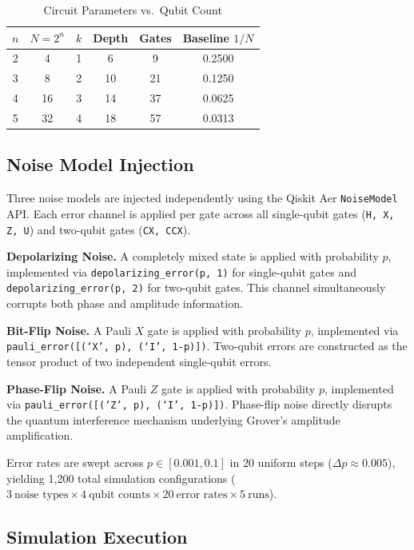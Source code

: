 \documentclass[conference]{IEEEtran}
\begin{document}
\begin{table}[htbp]
  \centering
  \caption{Circuit Parameters vs.\ Qubit Count}
  \label{tab:circuit}
  \begin{tabular}{ccccc c}
    \toprule
    $n$ & $N=2^n$ & $k$ & Depth & Gates & Baseline $1/N$ \\
    \midrule
    2 & 4  & 1 & 6  & 9  & 0.2500 \\
    3 & 8  & 2 & 10 & 21 & 0.1250 \\
    4 & 16 & 3 & 14 & 37 & 0.0625 \\
    5 & 32 & 4 & 18 & 57 & 0.0313 \\
    \bottomrule
  \end{tabular}
\end{table}

\subsection{Noise Model Injection}

Three noise models are injected independently using the Qiskit Aer \texttt{NoiseModel}
API. Each error channel is applied per gate across all single-qubit gates
(\texttt{H, X, Z, U}) and two-qubit gates (\texttt{CX, CCX}).

\textbf{Depolarizing Noise.} A completely mixed state is applied with probability
$p$, implemented via \texttt{depolarizing\_error(p, 1)} for single-qubit gates and
\texttt{depolarizing\_error(p, 2)} for two-qubit gates. This channel simultaneously
corrupts both phase and amplitude information.

\textbf{Bit-Flip Noise.} A Pauli $X$ gate is applied with probability $p$,
implemented via \texttt{pauli\_error([(`X', p), (`I', 1-p)])}. Two-qubit errors are
constructed as the tensor product of two independent single-qubit errors.

\textbf{Phase-Flip Noise.} A Pauli $Z$ gate is applied with probability $p$,
implemented via \texttt{pauli\_error([(`Z', p), (`I', 1-p)])}. Phase-flip noise
directly disrupts the quantum interference mechanism underlying Grover's amplitude
amplification.

Error rates are swept across $p \in [0.001, 0.1]$ in 20 uniform steps
($\Delta p \approx 0.005$), yielding 1{,}200 total simulation configurations
($3\ \text{noise types} \times 4\ \text{qubit counts} \times 20\ \text{error rates}
\times 5\ \text{runs}$).

\subsection{Simulation Execution}
\end{document}
